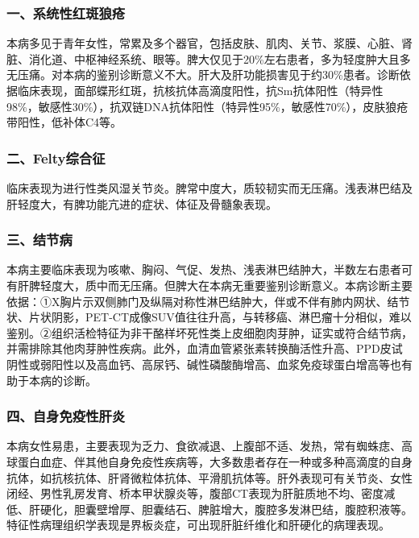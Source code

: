 \subsubsection{一、系统性红斑狼疮}

本病多见于青年女性，常累及多个器官，包括皮肤、肌肉、关节、浆膜、心脏、肾脏、消化道、中枢神经系统、眼等。脾大仅见于20\%左右患者，多为轻度肿大且多无压痛。对本病的鉴别诊断意义不大。肝大及肝功能损害见于约30\%患者。诊断依据临床表现，面部蝶形红斑，抗核抗体高滴度阳性，抗Sm抗体阳性（特异性98\%，敏感性30\%），抗双链DNA抗体阳性（特异性95\%，敏感性70\%），皮肤狼疮带阳性，低补体C4等。

\subsubsection{二、Felty综合征}

临床表现为进行性类风湿关节炎。脾常中度大，质较韧实而无压痛。浅表淋巴结及肝轻度大，有脾功能亢进的症状、体征及骨髓象表现。

\subsubsection{三、结节病}

本病主要临床表现为咳嗽、胸闷、气促、发热、浅表淋巴结肿大，半数左右患者可有肝脾轻度大，质中而无压痛。但脾大在本病无重要鉴别诊断意义。本病诊断主要依据：①X胸片示双侧肺门及纵隔对称性淋巴结肿大，伴或不伴有肺内网状、结节状、片状阴影，PET-CT成像SUV值往往升高，与转移癌、淋巴瘤十分相似，难以鉴别。②组织活检特征为非干酪样坏死性类上皮细胞肉芽肿，证实或符合结节病，并需排除其他肉芽肿性疾病。此外，血清血管紧张素转换酶活性升高、PPD皮试阴性或弱阳性以及高血钙、高尿钙、碱性磷酸酶增高、血浆免疫球蛋白增高等也有助于本病的诊断。

\subsubsection{四、自身免疫性肝炎}

本病女性易患，主要表现为乏力、食欲减退、上腹部不适、发热，常有蜘蛛痣、高球蛋白血症、伴其他自身免疫性疾病等，大多数患者存在一种或多种高滴度的自身抗体，如抗核抗体、肝肾微粒体抗体、平滑肌抗体等。肝外表现可有关节炎、女性闭经、男性乳房发育、桥本甲状腺炎等，腹部CT表现为肝脏质地不均、密度减低、肝硬化，胆囊壁增厚、胆囊结石、脾脏增大，腹腔多发淋巴结，腹腔积液等。特征性病理组织学表现是界板炎症，可出现肝脏纤维化和肝硬化的病理表现。

\protect\hypertarget{text00247.html}{}{}

